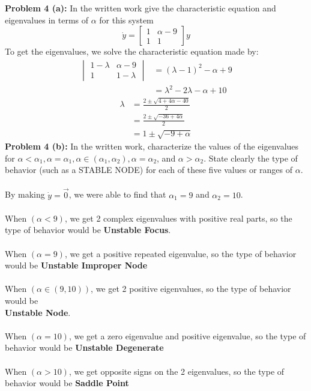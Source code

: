 \documentclass[12pt]{article}
\begin{document}
\noindent \textbf{Problem 4 (a): }In the written work give the characteristic equation and eigenvalues in terms of $\alpha$ for this system
	$$
	\dot{y} = 
	\begin{bmatrix}
		1 & \alpha - 9 \\
		1 & 1
	\end{bmatrix}y
	$$
To get the eigenvalues, we solve the characteristic equation made by:
	\begin{align*}
		\begin{vmatrix}
			1 - \lambda & \alpha - 9 \\
			1 & 1 -\lambda 
		\end{vmatrix}
		&= (\lambda - 1)^2 - \alpha + 9 \\
		&= \lambda^2 - 2\lambda - \alpha + 10
	\end{align*}
	\begin{align*}
		\lambda &= \frac{2 \pm \sqrt{4 + 4\alpha - 40}}{2} \\
		&= \frac{2 \pm \sqrt{-36 + 4\alpha}}{2} \\
		&= 1 \pm \sqrt{-9 + \alpha}
	\end{align*}
\noindent \textbf{Problem 4 (b): }In the written work, characterize the values of the eigenvalues for $\alpha < \alpha_1, \alpha = \alpha_1, \alpha \in (\alpha_1, \alpha_2), \alpha = \alpha_2$, and $\alpha > \alpha_2$. State clearly the type of behavior (such as a STABLE NODE) for each of these five values or ranges of $\alpha$.
\\ \\
By making $\dot{y} = \vec{0}$, we were able to find that $\alpha _1 = 9$ and $\alpha _2 = 10$.
\\ \\
When $(\alpha < 9)$, we get 2 complex eigenvalues with positive real parts, so the type of behavior would be \textbf{Unstable Focus}. 
\\ \\
When $(\alpha = 9)$, we get a positive repeated eigenvalue, so the type of behavior would be \textbf{Unstable Improper Node}
\\ \\
When $(\alpha \in (9,10))$, we get 2 positive eigenvalues, so the type of behavior would be \\ 
\textbf{Unstable Node}. 
\\ \\
When $(\alpha = 10)$, we get a zero eigenvalue and positive eigenvalue, so the type of behavior would be \textbf{Unstable Degenerate}
\\ \\
When $(\alpha > 10)$, we get opposite signs on the 2 eigenvalues, so the type of behavior would be \textbf{Saddle Point}
\end{document}
